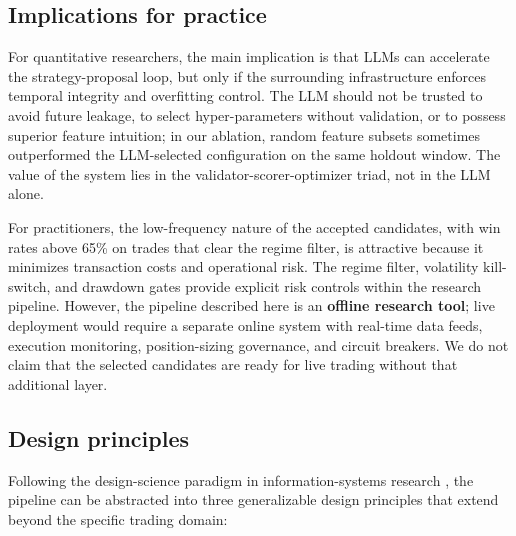 \documentclass[analytics,article,submit,pdftex,moreauthors]{Definitions/mdpi}
\begin{document}
\subsection{Implications for practice}\label{implications-for-practice}

For quantitative researchers, the main implication is that LLMs can accelerate the strategy-proposal loop, but only if the surrounding infrastructure enforces temporal integrity and overfitting control. The LLM should not be trusted to avoid future leakage, to select hyper-parameters without validation, or to possess superior feature intuition; in our ablation, random feature subsets sometimes outperformed the LLM-selected configuration on the same holdout window. The value of the system lies in the validator-scorer-optimizer triad, not in the LLM alone.

For practitioners, the low-frequency nature of the accepted candidates, with win rates above 65\% on trades that clear the regime filter, is attractive because it minimizes transaction costs and operational risk. The regime filter, volatility kill-switch, and drawdown gates provide explicit risk controls within the research pipeline. However, the pipeline described here is an \textbf{offline research tool}; live deployment would require a separate online system with real-time data feeds, execution monitoring, position-sizing governance, and circuit breakers. We do not claim that the selected candidates are ready for live trading without that additional layer.

\subsection{Design principles}\label{design-principles}

Following the design-science paradigm in information-systems research \citep{hevner_2004}, the pipeline can be abstracted into three generalizable design principles that extend beyond the specific trading domain:
\end{document}
